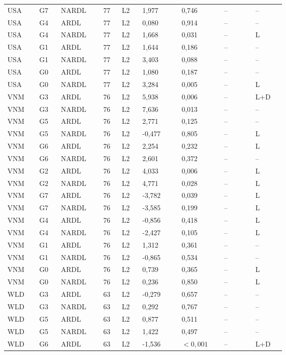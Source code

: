 {\begin{longtable}{p{0.075\linewidth}p{0.05\linewidth}p{0.09\linewidth}p{0.04\linewidth}p{0.05\linewidth}p{0.1\linewidth}p{0.085\linewidth}p{0.085\linewidth}p{0.075\linewidth}}
USA & G7 & NARDL & 77 & L2 & 1,977 & 0,746 & -- & --\\
USA & G4 & ARDL & 77 & L2 & 0,080 & 0,914 & -- & --\\
USA & G4 & NARDL & 77 & L2 & 1,668 & 0,031 & -- & L\\
USA & G1 & ARDL & 77 & L2 & 1,644 & 0,186 & -- & --\\
USA & G1 & NARDL & 77 & L2 & 3,403 & 0,088 & -- & --\\
USA & G0 & ARDL & 77 & L2 & 1,080 & 0,187 & -- & --\\
USA & G0 & NARDL & 77 & L2 & 3,284 & 0,005 & -- & L\\
VNM & G3 & ARDL & 76 & L2 & 5,938 & 0,006 & -- & L+D\\
VNM & G3 & NARDL & 76 & L2 & 7,636 & 0,013 & -- & --\\
VNM & G5 & ARDL & 76 & L2 & 2,771 & 0,125 & -- & --\\
VNM & G5 & NARDL & 76 & L2 & -0,477 & 0,805 & -- & L\\
VNM & G6 & ARDL & 76 & L2 & 2,254 & 0,232 & -- & L\\
VNM & G6 & NARDL & 76 & L2 & 2,601 & 0,372 & -- & --\\
VNM & G2 & ARDL & 76 & L2 & 4,033 & 0,006 & -- & L\\
VNM & G2 & NARDL & 76 & L2 & 4,771 & 0,028 & -- & L\\
VNM & G7 & ARDL & 76 & L2 & -3,782 & 0,039 & -- & L\\
VNM & G7 & NARDL & 76 & L2 & -3,585 & 0,199 & -- & L\\
VNM & G4 & ARDL & 76 & L2 & -0,856 & 0,418 & -- & L\\
VNM & G4 & NARDL & 76 & L2 & -2,427 & 0,105 & -- & L\\
VNM & G1 & ARDL & 76 & L2 & 1,312 & 0,361 & -- & --\\
VNM & G1 & NARDL & 76 & L2 & -0,865 & 0,534 & -- & --\\
VNM & G0 & ARDL & 76 & L2 & 0,739 & 0,365 & -- & L\\
VNM & G0 & NARDL & 76 & L2 & 0,236 & 0,850 & -- & L\\
WLD & G3 & ARDL & 63 & L2 & -0,279 & 0,657 & -- & --\\
WLD & G3 & NARDL & 63 & L2 & 0,292 & 0,767 & -- & --\\
WLD & G5 & ARDL & 63 & L2 & 0,877 & 0,511 & -- & --\\
WLD & G5 & NARDL & 63 & L2 & 1,422 & 0,497 & -- & --\\
WLD & G6 & ARDL & 63 & L2 & -1,536 & \(<0{,}001\) & -- & L+D\\

\end{longtable}}
